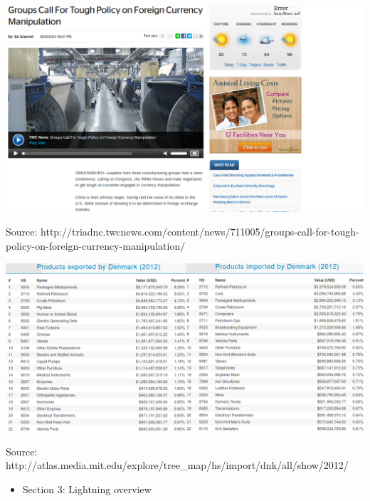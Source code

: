 \documentclass[ignorenonframetext,]{beamer}
\begin{document}
\begin{frame}

    \includegraphics[scale=0.3]{currency_manipulation.png}

    {\tiny Source: http://triadnc.twcnews.com/content/news/711005/groups-call-for-tough-policy-on-foreign-currency-manipulation/}

\end{frame}

\begin{frame}

    \includegraphics[scale=0.28]{Denmark_disaggregated_trade.png}
    
    {\tiny Source: http://atlas.media.mit.edu/explore/tree\_map/hs/import/dnk/all/show/2012/}

\end{frame}

\begin{frame}

    \begin{itemize}
        \item Section 3: Lightning overview
    \end{itemize}

\end{frame}
\end{document}
